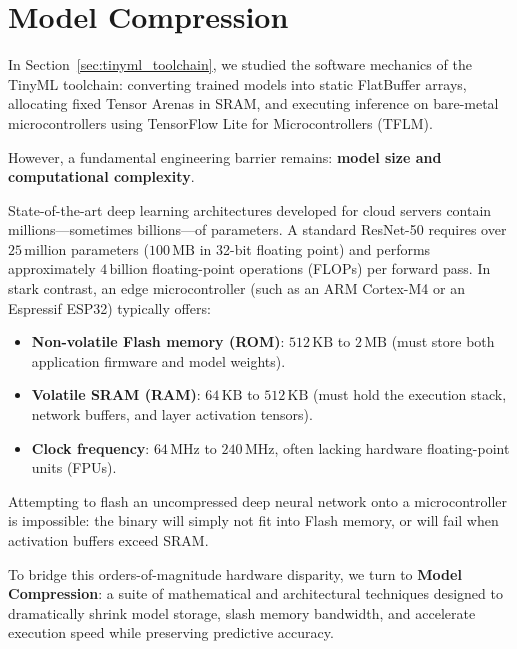 \section{Model Compression}\label{sec:model_compression}

In Section~\ref{sec:tinyml_toolchain}, we studied the software mechanics of the TinyML toolchain: converting trained models into static FlatBuffer arrays, allocating fixed Tensor Arenas in SRAM, and executing inference on bare-metal microcontrollers using TensorFlow Lite for Microcontrollers (TFLM).

However, a fundamental engineering barrier remains: \textbf{model size and computational complexity}.

State-of-the-art deep learning architectures developed for cloud servers contain millions---sometimes billions---of parameters. A standard ResNet-50 requires over $25\,\text{million}$ parameters ($100\,\text{MB}$ in 32-bit floating point) and performs approximately $4\,\text{billion}$ floating-point operations (FLOPs) per forward pass. In stark contrast, an edge microcontroller (such as an ARM Cortex-M4 or an Espressif ESP32) typically offers:
\begin{itemize}
    \item \textbf{Non-volatile Flash memory (ROM)}: $512\,\text{KB}$ to $2\,\text{MB}$ (must store both application firmware and model weights).
    \item \textbf{Volatile SRAM (RAM)}: $64\,\text{KB}$ to $512\,\text{KB}$ (must hold the execution stack, network buffers, and layer activation tensors).
    \item \textbf{Clock frequency}: $64\,\text{MHz}$ to $240\,\text{MHz}$, often lacking hardware floating-point units (FPUs).
\end{itemize}

Attempting to flash an uncompressed deep neural network onto a microcontroller is impossible: the binary will simply not fit into Flash memory, or  will fail when activation buffers exceed SRAM.

To bridge this orders-of-magnitude hardware disparity, we turn to \textbf{Model Compression}: a suite of mathematical and architectural techniques designed to dramatically shrink model storage, slash memory bandwidth, and accelerate execution speed while preserving predictive accuracy.

